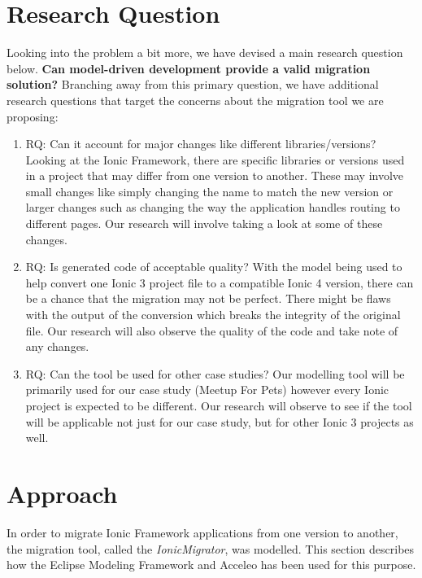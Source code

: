\documentclass[conference]{IEEEtran}
\begin{document}
\section{Research Question}
Looking into the problem a bit more, we have devised a main research question below.
\newline \newline \textbf{Can model-driven development provide a valid migration solution?}
\newline \newline Branching away from this primary question, we have additional research questions that target the concerns about the migration tool we are proposing:
\begin{enumerate}
    \item RQ: Can it account for major changes like different libraries/versions?
    \newline Looking at the Ionic Framework, there are specific libraries or versions used in a project that may differ from one version to another.
    These may involve small changes like simply changing the name to match the new version or larger changes such as changing the way the application handles routing to different pages.
    Our research will involve taking a look at some of these changes.
    \item RQ: Is generated code of acceptable quality?
    \newline With the model being used to help convert one Ionic 3 project file to a compatible Ionic 4 version, there can be a chance that the migration may not be perfect.
    There might be flaws with the output of the conversion which breaks the integrity of the original file. Our research will also observe the quality of the code and take note of any changes.
    \item RQ: Can the tool be used for other case studies?
    \newline Our modelling tool will be primarily used for our case study (Meetup For Pets) however every Ionic project is expected to be different.
    Our research will observe to see if the tool will be applicable not just for our case study, but for other Ionic 3 projects as well.
\end{enumerate}

\section{Approach}

In order to migrate Ionic Framework applications from one version to another, the migration tool, called the \textit{IonicMigrator}, was modelled. This section describes how the Eclipse Modeling Framework and Acceleo has been used for this purpose.
\end{document}
